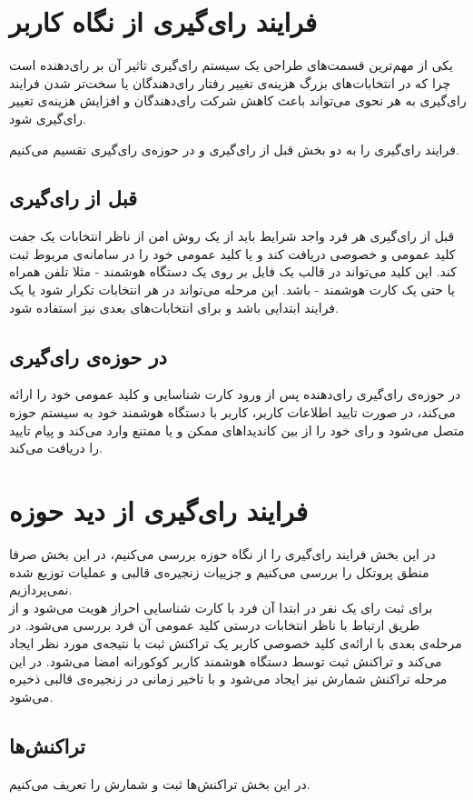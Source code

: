 \section{فرایند رای‌گیری از نگاه کاربر}
یکی از مهم‌ترین قسمت‌های طراحی یک سیستم رای‌گیری تاثیر آن بر رای‌دهنده است چرا که در انتخابات‌های بزرگ هزینه‌ی تغییر رفتار رای‌دهندگان یا سخت‌تر شدن فرایند رای‌گیری به هر نحوی می‌تواند باعث کاهش شرکت رای‌دهندگان و افزایش هزینه‌ی تغییر رای‌گیری شود.
\par
فرایند رای‌گیری را به دو بخش قبل از رای‌گیری و در حوزه‌ی رای‌گیری تقسیم می‌کنیم. 
\subsection{قبل از رای‌گیری}
قبل از رای‌گیری هر فرد واجد شرایط باید از یک روش امن از ناظر انتخابات یک جفت کلید عمومی و خصوصی دریافت کند و یا کلید عمومی خود را در سامانه‌ی مربوط ثبت کند. این کلید می‌تواند در قالب یک فایل بر روی یک دستگاه هوشمند - مثلا تلفن همراه یا حتی یک کارت هوشمند - باشد. این مرحله  می‌تواند در هر انتخابات تکرار شود یا یک فرایند ابتدایی باشد و برای انتخابات‌های بعدی نیز استفاده شود. 
\subsection{در حوزه‌ی رای‌گیری}
در حوزه‌ی رای‌گیری رای‌دهنده پس از ورود کارت شناسایی و کلید عمومی خود را ارائه می‌کند، در صورت تایید اطلاعات کاربر، کاربر با دستگاه هوشمند خود به سیستم‌ حوزه متصل می‌شود و رای‌ خود را از بین‌ کاندیدا‌های ممکن و یا ممتنع وارد می‌کند و پیام تایید را دریافت می‌کند. 
\section{فرایند رای‌گیری از دید حوزه‌}
در این بخش فرایند رای‌گیری را از نگاه حوزه‌ بررسی می‌کنیم، در این بخش صرفا منطق پروتکل را بررسی می‌کنیم و جزییات زنجیره‌ی قالبی و عملیات توزیع شده نمی‌پردازیم. 
\\
برای ثبت رای یک‌ نفر در ابتدا آن فرد با کارت شناسایی احراز هویت می‌شود و از طریق ارتباط با ناظر انتخابات درستی کلید عمومی آن فرد بررسی می‌شود. در مرحله‌ی بعدی با ارائه‌ی کلید خصوصی کاربر یک تراکنش ثبت با نتیجه‌ی مورد نظر ایجاد می‌کند و تراکنش ثبت توسط دستگاه هوشمند کاربر کوکورانه امضا می‌شود. در این مرحله تراکنش شمارش نیز ایجاد می‌شود و با تاخیر زمانی در زنجیره‌ی قالبی ذخیره می‌شود.

\subsection{تراکنش‌ها}
در این بخش تراکنش‌ها ثبت و شمارش را تعریف می‌کنیم.
